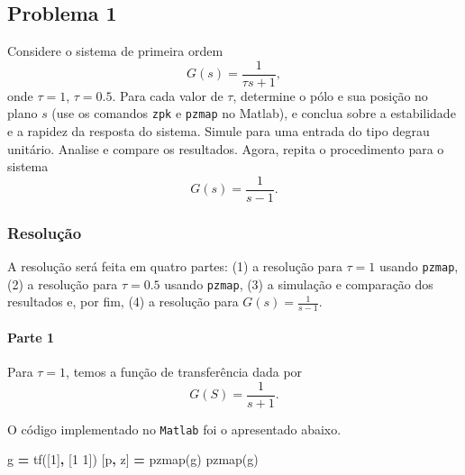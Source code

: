 \documentclass[
]{book}
\newenvironment{Shaded}{\begin{snugshade}}{\end{snugshade}}
\newcommand{\FloatTok}[1]{\textcolor[rgb]{0.00,0.00,0.81}{#1}}
\newcommand{\NormalTok}[1]{#1}
\newcommand{\OperatorTok}[1]{\textcolor[rgb]{0.81,0.36,0.00}{\textbf{#1}}}
\newcommand{\VariableTok}[1]{\textcolor[rgb]{0.00,0.00,0.00}{#1}}
\begin{document}
\hypertarget{problema-1}{%
\subsection*{Problema 1}\label{problema-1}}

Considere o sistema de primeira ordem
\[
G(s) = \frac{1}{\tau s +1},
\]
onde \(\tau = 1\), \(\tau = 0.5\). Para cada valor de \(\tau\), determine o pólo e sua posição no plano \(s\) (use os comandos \texttt{zpk} e \texttt{pzmap} no Matlab), e conclua sobre a estabilidade e a rapidez da resposta do sistema. Simule para uma entrada do tipo degrau unitário. Analise e compare os resultados. Agora, repita o procedimento para o sistema
\[
G(s) = \frac{1}{s-1}.
\]

\hypertarget{resoluuxe7uxe3o}{%
\subsubsection*{Resolução}\label{resoluuxe7uxe3o}}

A resolução será feita em quatro partes: (1) a resolução para \(\tau = 1\) usando \texttt{pzmap}, (2) a resolução para \(\tau = 0.5\) usando \texttt{pzmap}, (3) a simulação e comparação dos resultados e, por fim, (4) a resolução para \(G(s) =\frac {1}{s-1}\).

\hypertarget{parte-1}{%
\paragraph*{Parte 1}\label{parte-1}}

Para \(\tau = 1\), temos a função de transferência dada por
\[
G(S)= \frac {1}{s+1}.
\]

O código implementado no \texttt{Matlab} foi o apresentado abaixo.

\begin{Shaded}
\begin{Highlighting}[]
\VariableTok{g} \OperatorTok{=} \VariableTok{tf}\NormalTok{([}\FloatTok{1}\NormalTok{]}\OperatorTok{,}\NormalTok{ [}\FloatTok{1} \FloatTok{1}\NormalTok{])}
\NormalTok{[}\VariableTok{p}\OperatorTok{,} \VariableTok{z}\NormalTok{] }\OperatorTok{=} \VariableTok{pzmap}\NormalTok{(}\VariableTok{g}\NormalTok{)}
\VariableTok{pzmap}\NormalTok{(}\VariableTok{g}\NormalTok{)}
\end{Highlighting}
\end{Shaded}
\end{document}
